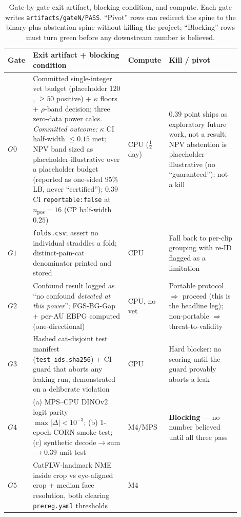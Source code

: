 \begin{table}[t]
\centering
\caption{Gate-by-gate exit artifact, blocking condition, and compute. Each gate writes
\texttt{artifacts/gateN/PASS}. ``Pivot'' rows can redirect the spine to the binary-plus-abstention
spine without killing the project; ``Blocking'' rows must turn green before any downstream number is
believed.}
\label{tab:gate-matrix}
\footnotesize
\begin{tabular}{@{}p{0.10\linewidth}p{0.40\linewidth}p{0.10\linewidth}p{0.30\linewidth}@{}}
\toprule
\textbf{Gate} & \textbf{Exit artifact + blocking condition} & \textbf{Compute} & \textbf{Kill / pivot} \\
\midrule
$G0$ & Committed single-integer vet budget (placeholder $120$, $\geq 50$ positive) + $\kappa$
floors + $\rho$-band decision; three zero-data power calcs. \emph{Committed outcome:} $\kappa$ CI
half-width $\leq 0.15$ met; NPV band sized as placeholder-illustrative over a placeholder budget
(reported as one-sided $95\%$ LB, never ``certified''); $0.39$ CI \texttt{reportable:false} at
$n_{\text{pos}}{=}16$ (CP half-width $0.25$) &
CPU ($\tfrac{1}{2}$ day) &
$0.39$ point ships as exploratory future work, not a result; NPV abstention is
placeholder-illustrative (no ``guaranteed''); not a kill \\
\addlinespace
$G1$ & \texttt{folds.csv}; assert no individual straddles a fold; distinct-pain-cat
denominator printed and stored &
CPU &
Fall back to per-clip grouping with re-ID flagged as a limitation \\
\addlinespace
$G2$ & Confound result logged as ``no confound \emph{detected at this power}''; FGS-BG-Gap +
per-AU EBPG computed (one-directional) &
CPU, no vet &
Portable protocol $\Rightarrow$ proceed (this is the headline leg); non-portable $\Rightarrow$
threat-to-validity \\
\addlinespace
$G3$ & Hashed cat-disjoint test manifest (\texttt{test\_ids.sha256}) + CI guard that aborts
any leaking run, demonstrated on a deliberate violation &
CPU &
Hard blocker: no scoring until the guard provably aborts a leak \\
\addlinespace
$G4$ & (a) MPS--CPU DINOv2 logit parity $\max|\Delta|<10^{-3}$; (b) 1-epoch CORN smoke test;
(c) synthetic decode$\to$sum$\to 0.39$ unit test &
M4/MPS &
\textbf{Blocking} --- no number believed until all three pass \\
\addlinespace
$G5$ & CatFLW-landmark NME inside crop vs eye-aligned crop + median face resolution, both
clearing \texttt{prereg.yaml} thresholds &
M4 &

\end{tabular}
\end{table}
